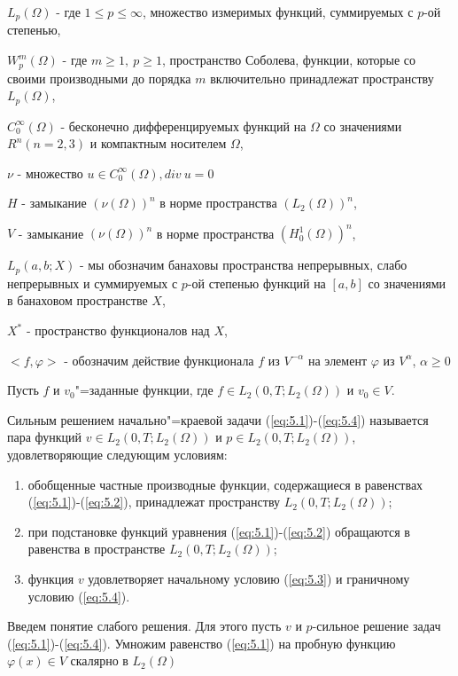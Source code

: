 $L_p(\Omega)$ - где $1\leqslant p\leqslant\infty$, множество измеримых функций, суммируемых с $p$-ой степенью,

$W_p^m(\Omega)$ - где $m\geqslant 1, \ p\geqslant 1$, пространство Соболева,
функции, которые со своими производными до порядка $m$ включительно принадлежат пространству $L_p(\Omega)$,

$C_0^{\infty}(\Omega)$ - бесконечно дифференцируемых функций на $\Omega$ со значениями $R^n(n=2, 3)$ и компактным носителем $\Omega$,

$\nu$ - множество ${u\in C_0^{\infty}(\Omega), div \ u=0}$

$H$ - замыкание $(\nu (\Omega))^n$ в норме пространства $(L_2(\Omega))^n$,

$V$ - замыкание $(\nu (\Omega))^n$ в норме пространства $(H_0^1(\Omega))^n$,

$L_p(a, b;X)$ - мы обозначим банаховы пространства непрерывных, слабо непрерывных и суммируемых с $p$-ой степенью функций на $[a, b]$ со значениями в
банаховом пространстве $X$,

$X^*$ - пространство функционалов над $X$,

$<f,\varphi>$ - обозначим действие функционала $f$ из $V^{-\alpha}$ на элемент $\varphi$ из $V^{\alpha}$, $\alpha\geqslant 0$

Пусть $f$ и $v_0$"=заданные функции,
где $f\in L_2(0, T; L_2(\Omega))$ и $v_0\in V$.

\begin{definition}
    Сильным решением начально"=краевой задачи (\ref{eq:5.1})-(\ref{eq:5.4}) называется пара функций $v\in L_2(0, T; L_2(\Omega))$ и
    $p\in L_2(0, T; L_2(\Omega))$, удовлетворяющие следующим условиям:
\end{definition}

\begin{enumerate} 
    \item обобщенные частные производные функции, содержащиеся в равенствах (\ref{eq:5.1})-(\ref{eq:5.2}), принадлежат пространству $L_2(0, T; L_2(\Omega))$;
    \item при подстановке функций уравнения (\ref{eq:5.1})-(\ref{eq:5.2}) обращаются в равенства в пространстве $L_2(0, T; L_2(\Omega))$;
    \item функция $v$ удовлетворяет начальному условию (\ref{eq:5.3}) и граничному условию (\ref{eq:5.4}).
\end{enumerate}

Введем понятие слабого решения. Для этого пусть $v$ и $p$-сильное решение задач (\ref{eq:5.1})-(\ref{eq:5.4}).
Умножим равенство (\ref{eq:5.1}) на пробную функцию $\varphi (x)\in V$ скалярно в $L_2(\Omega)$

